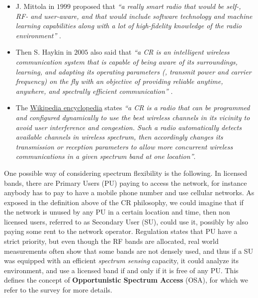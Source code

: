 \begin{itemize}\tightlist
    \item
    J. Mittola in $1999$ proposed that
    \emph{``a really smart radio that would be self-, RF- and user-aware, and that would include software technology and machine learning capabilities along with a lot of high-fidelity knowledge of the radio environment''} \cite{Mitola99}.

    \item
    Then S. Haykin in $2005$ also said that
    \emph{``a CR is an intelligent wireless communication system that is capable of being aware of its surroundings, learning, and adapting its operating parameters (\eg, transmit power and carrier frequency) on the fly with an objective of providing reliable anytime, anywhere, and spectrally efficient communication''} \cite{Haykin05}.

    \item
    The \href{https://en.wikipedia.org/wiki/Cognitive_radio}{Wikipedia encyclopedia} states
    \emph{``a CR is a radio that can be programmed and configured dynamically to use the best wireless channels in its vicinity to avoid user interference and congestion. Such a radio automatically detects available channels in wireless spectrum, then accordingly changes its transmission or reception parameters to allow more concurrent wireless communications in a given spectrum band at one location''}.
\end{itemize}


One possible way of considering spectrum flexibility is the following.
%
In licensed bands, there are Primary Users (PU) paying to access the network, for instance anybody has to pay to have a mobile phone number and use cellular networks.
As exposed in the definition above of the CR philosophy, we could imagine that if the network is unused by any PU in a certain location and time, then non licensed users, referred to as Secondary User (SU), could use it, possibly by also paying some rent to the network operator.
%
Regulation states that PU have a strict priority,
but even though the RF bands are allocated, real world measurements often show that some bands are not densely used, and thus if a SU was equipped with an efficient \emph{spectrum sensing} capacity, it could analyze its environment, and use a licensed band if and only if it is free of any PU.
This defines the concept of \textbf{Opportunistic Spectrum Access} (OSA), for which we refer to the survey \cite{Zhao07} for more details.



